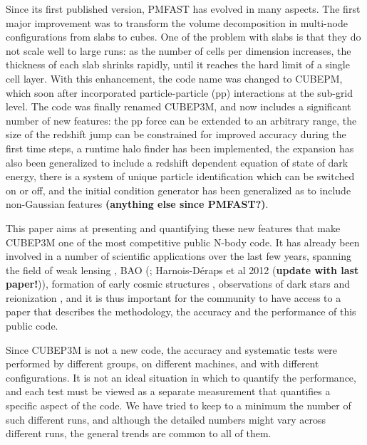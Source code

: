 Since its first published version, {\small PMFAST} has evolved in many aspects. 
The first major improvement was to transform the volume decomposition in multi-node configurations 
from slabs to cubes. One of the problem with slabs is that they do not scale well to large runs: 
as the number of cells per dimension increases, the thickness of each slab shrinks rapidly,
until it reaches the hard limit of a single cell layer.  With this enhancement, the code name was changed to {\small CUBEPM},
which soon after incorporated particle-particle (pp) interactions at the sub-grid level. 
The code was finally renamed {\small CUBEP3M}, and now includes a significant number of new features: the pp force
can be extended to an arbitrary range, the size of the redshift jump can be constrained for improved accuracy during the first time steps,
a runtime halo finder has been implemented, the expansion has also been generalized to include a redshift dependent equation of state of dark energy, there is a system of unique particle identification which can be switched on or off, and the initial condition generator has been generalized as to include non-Gaussian features {\bf (anything else since PMFAST?)}.

This paper aims at presenting and quantifying these new features that make {\small CUBEP3M} one of the most competitive public N-body code.
It has already been involved in a number of scientific applications over the last few years,
spanning the field of weak lensing \citep{Vafaei10, 2008MNRAS.388.1819L,  2009arXiv0905.0501D, 2010PhRvD..81l3015L, 2010arXiv1012.0444Y, 2012arXiv1202.2332H},  BAO
 (\cite{2010arXiv1008.3506Z,  2011arXiv1106.5548N, 2011arXiv1109.5746H}; Harnois-D\'{eraps} et al 2012 ({\bf update with last paper!})), 
formation of early cosmic structures \citep{2008arXiv0806.2887I,2010arXiv1005.2502I},
observations of dark stars \citep{2010MNRAS.407L..74Z,2012MNRAS.tmp.2794I} and
reionization \citep{2011arXiv1107.4772I,Fernandez:2011ab,2011MNRAS.413.1353F,2012MNRAS.422..926M,Datta:2011hv,2012arXiv1203.0517F},  
and it is thus important for the community to have access to a paper that describes the methodology, the accuracy and the performance of this public code. 


Since {\small CUBEP3M} is not a new code, the accuracy and systematic tests were performed by different groups, on different machines,
and with different configurations. It is not an ideal situation in which to quantify the performance, and each test must be viewed as a
separate measurement that quantifies a specific aspect of the code. 
We have tried to keep to a minimum the number of such different runs, and although the detailed numbers might vary across different runs, 
the general trends are common to all of them.


